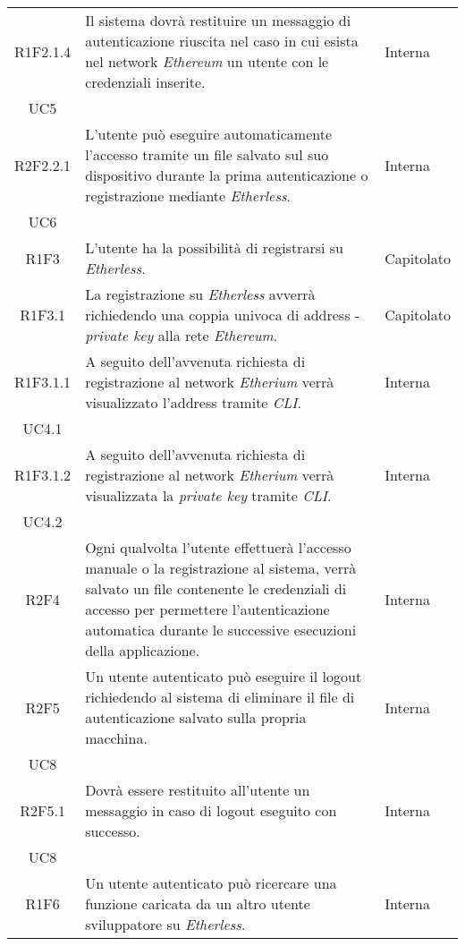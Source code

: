 \begin{longtable}{|c|p{8cm}|C{2cm}|}
	R1F2.1.4 &  Il sistema dovrà restituire un messaggio di autenticazione riuscita nel caso in cui esista nel network \textit{Ethereum\glo} un utente con le credenziali inserite. & \centering Interna \\ UC5 \tabularnewline

	R2F2.2.1 &  L'utente può eseguire automaticamente l'accesso tramite un file salvato sul suo dispositivo durante la prima autenticazione o registrazione mediante \textit{Etherless}.  & \centering Interna \\ UC6 \tabularnewline

	R1F3 &  L'utente ha la possibilità di registrarsi su \textit{Etherless}.  & Capitolato \\

	R1F3.1 &  La registrazione su \textit{Etherless} avverrà richiedendo una coppia univoca di address - \textit{private key\glo} alla rete \textit{Ethereum\glos}.  & Capitolato \\

	R1F3.1.1 &  A seguito dell'avvenuta richiesta di registrazione al network \textit{Etherium\glo} verrà visualizzato l'address tramite \textit{CLI\glos}.  & \centering Interna \\ UC4.1 \tabularnewline

	R1F3.1.2 &  A seguito dell'avvenuta richiesta di registrazione al network \textit{Etherium\glo} verrà visualizzata la \textit{private key\glo} tramite \textit{CLI\glos}.  & \centering Interna \\ UC4.2 \tabularnewline

	R2F4 &  Ogni qualvolta l'utente effettuerà l'accesso manuale o la registrazione al sistema, verrà salvato un file contenente le credenziali di accesso per permettere l'autenticazione automatica durante le successive esecuzioni della applicazione.  & Interna \\

	R2F5 &  Un utente autenticato può eseguire il logout richiedendo al sistema di eliminare il file di autenticazione salvato sulla propria macchina.  & \centering Interna \\ UC8 \tabularnewline

	R2F5.1 &  Dovrà essere restituito all'utente un messaggio in caso di logout eseguito con successo.  & \centering Interna \\ UC8 \tabularnewline

	R1F6 &  Un utente autenticato può ricercare una funzione caricata da un altro utente sviluppatore su \textit{Etherless}.  & Interna \\


\end{longtable}
